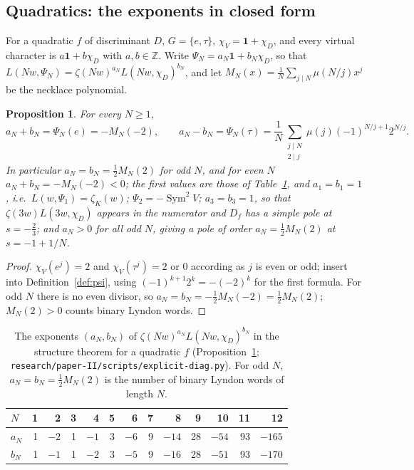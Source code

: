 \documentclass[11pt,a4paper]{article}
\newtheorem{proposition}[theorem]{Proposition}
\theoremstyle{remark}\newtheorem{remark}[theorem]{Remark}
\newcommand{\Z}{\mathbb{Z}}\newcommand{\Q}{\mathbb{Q}}\newcommand{\F}{\mathbb{F}}\newcommand{\C}{\mathbb{C}}
\newcommand{\Sym}{\operatorname{Sym}}\newcommand{\Res}{\operatorname*{Res}}
\begin{document}
\subsection{Quadratics: the exponents in closed form}

For a quadratic $f$ of discriminant $D$, $G=\{e,\tau\}$, $\chi_V=\mathbf 1+\chi_D$, and every virtual
character is $a\mathbf 1+b\chi_D$ with $a,b\in\Z$. Write $\Psi_N=a_N\mathbf 1+b_N\chi_D$, so that
$L(Nw,\Psi_N)=\zeta(Nw)^{a_N}L(Nw,\chi_D)^{b_N}$, and let $M_N(x)=\frac1N\sum_{j\mid N}\mu(N/j)x^j$ be the
necklace polynomial.

\begin{proposition}\label{prop:exponents}
For every $N\ge1$,
\[
a_N+b_N=\Psi_N(e)=-M_N(-2),\qquad
a_N-b_N=\Psi_N(\tau)=\frac1N\sum_{\substack{j\mid N\\ 2\mid j}}\mu(j)(-1)^{N/j+1}2^{N/j}.
\]
In particular $a_N=b_N=\tfrac12M_N(2)$ for odd $N$, and for even $N$
$a_N+b_N=-M_N(-2)<0$; the first values are those of Table~\ref{tab:exponents}, and $a_1=b_1=1$, i.e.\
$L(w,\Psi_1)=\zeta_K(w)$; $\Psi_2=-\Sym^2V$; $a_3=b_3=1$, so that $\zeta(3w)L(3w,\chi_D)$ appears in the
numerator and $D_f$ has a simple pole at $s=-\tfrac23$; and $a_N>0$ for all odd $N$, giving a pole of order
$a_N=\tfrac12M_N(2)$ at $s=-1+1/N$.
\end{proposition}
\begin{proof}
$\chi_V(e^j)=2$ and $\chi_V(\tau^j)=2$ or $0$ according as $j$ is even or odd; insert into
Definition~\ref{def:psi}, using $(-1)^{k+1}2^k=-(-2)^k$ for the first formula. For odd $N$ there is no even
divisor, so $a_N=b_N=-\tfrac12M_N(-2)=\tfrac12M_N(2)$; $M_N(2)>0$ counts binary Lyndon words.
\end{proof}

\begin{table}[htbp]
\centering\small
\caption{The exponents $(a_N,b_N)$ of $\zeta(Nw)^{a_N}L(Nw,\chi_D)^{b_N}$ in the structure theorem for a quadratic $f$
(Proposition~\ref{prop:exponents}; \texttt{research/paper-II/scripts/explicit-diag.py}). For odd $N$, $a_N=b_N=\tfrac12M_N(2)$ is the
number of binary Lyndon words of length $N$.}\label{tab:exponents}
\begin{tabular}{lrrrrrrrrrrrr}
\toprule
$N$ & 1 & 2 & 3 & 4 & 5 & 6 & 7 & 8 & 9 & 10 & 11 & 12\\
\midrule
$a_N$ & 1 & $-2$ & 1 & $-1$ & 3 & $-6$ & 9 & $-14$ & 28 & $-54$ & 93 & $-165$\\
$b_N$ & 1 & $-1$ & 1 & $-2$ & 3 & $-5$ & 9 & $-16$ & 28 & $-51$ & 93 & $-170$\\
\bottomrule
\end{tabular}
\end{table}
\end{document}
